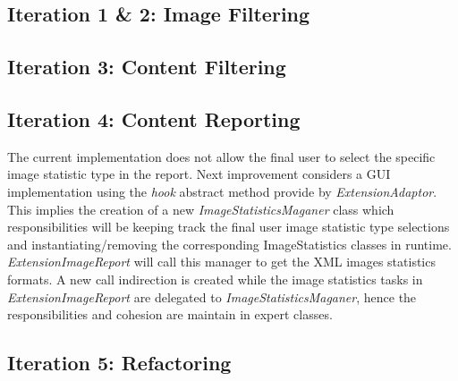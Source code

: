 \subsection{Iteration 1 \& 2: Image Filtering}
\subsection{Iteration 3: Content Filtering}
\subsection{Iteration 4: Content Reporting}
The current implementation does not allow the final user to select the specific image statistic type in the report. Next improvement considers a GUI implementation using the \textit{hook} abstract method provide by \textit{ExtensionAdaptor}. This implies the creation of a new \textit{ImageStatisticsMaganer} class which responsibilities will be keeping track the final user image statistic type selections and instantiating/removing the corresponding ImageStatistics classes in runtime. \textit{ExtensionImageReport} will call this manager to get the XML images statistics formats. A new call indirection is created while the image statistics tasks in \textit{ExtensionImageReport} are delegated to \textit{ImageStatisticsMaganer}, hence the responsibilities and cohesion are maintain in expert classes. 

\subsection{Iteration 5: Refactoring}